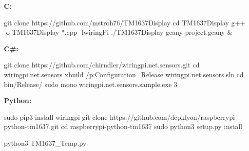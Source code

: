 
\textbf{C:} 

\begin{console}
	git clone https://github.com/mstroh76/TM1637Display
	cd TM1637Display
	g++ -o TM1637Display *.cpp -lwiringPi
	./TM1637Display
	geany project.geany & 
\end{console}

\textbf{C\#:}

\begin{console}
	git clone https://github.com/chirndler/wiringpi.net.sensors.git
	cd wiringpi.net.sensors
	xbuild /p:Configuration=Release wiringpi.net.sensors.sln
	cd bin/Release/
	sudo mono wiringpi.net.sensors.sample.exe 3
\end{console}

\clearpage
\textbf{Python:}
\begin{console}
	sudo pip3 install wiringpi
	git clone https://github.com/depklyon/raspberrypi-python-tm1637.git
	cd raspberrypi-python-tm1637
	sudo python3 setup.py install
\end{console}

\lstset{language=Python, caption=, 
        label=TM1637Program, frame=single, basicstyle=\ttfamily
	      \footnotesize, breakatwhitespace=false, showstringspaces=false, 
        showtabs=false, tabsize=2 }


\begin{console}
	python3 TM1637_Temp.py
\end{console}